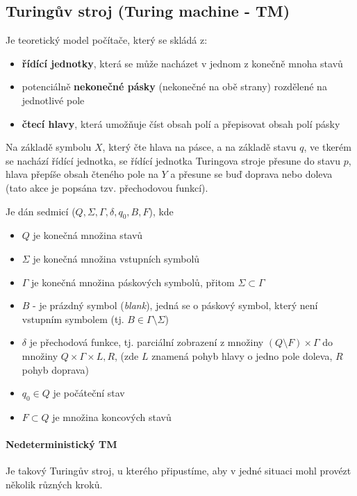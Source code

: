 \label{heading:tm}
\subsection{Turingův stroj (Turing machine - TM)}
Je teoretický model počítače, který se skládá z:

\begin{itemize}[itemsep=0pt]
    \item \textbf{řídící jednotky}, která se může nacházet v jednom z konečně mnoha stavů
    \item potenciálně \textbf{nekonečné pásky} (nekonečné na obě strany) rozdělené na jednotlivé pole
    \item \textbf{čtecí hlavy}, která umožňuje číst obsah polí a přepisovat obsah polí pásky
\end{itemize}

Na základě symbolu $X$, který čte hlava na pásce, a na základě stavu $q$, ve tkerém se nachází řídící jednotka, se řídící jednotka Turingova stroje přesune do stavu $p$, hlava přepíše obsah čteného pole na $Y$ a přesune se buď doprava nebo doleva (tato akce je popsána tzv. přechodovou funkcí).

Je dán sedmicí ($Q,\Sigma, \Gamma, \delta, 
q_0, B, F$), kde

\begin{itemize}[itemsep=0pt]
    \item $Q$ je konečná množina stavů
    \item $\Sigma$ je konečná množina vstupních symbolů
    \item $\Gamma$ je konečná množina páskových symbolů, přitom $\Sigma \subset \Gamma$
    \item $B$ - je prázdný symbol (\textit{blank}), jedná se o páskový symbol, který není vstupním symbolem (tj. $B \in \Gamma \setminus \Sigma$)
    \item $\delta$ je přechodová funkce, tj. parciální zobrazení z množiny $(Q \setminus F) \times \Gamma$ do množiny $Q \times \Gamma \times {L,R}$, (zde $L$ znamená pohyb hlavy o jedno pole doleva, $R$ pohyb doprava)
    \item $q_0 \in Q$ je počáteční stav
    \item $F \subset Q$ je množina koncových stavů
\end{itemize}

\paragraph{Nedeterministický TM} Je takový Turingův stroj, u kterého připustíme, aby v jedné situaci mohl provézt několik různých kroků.

